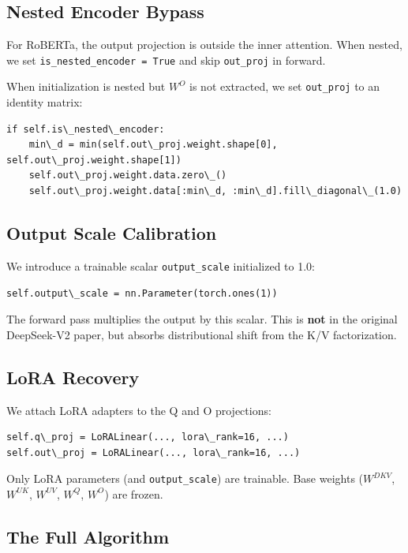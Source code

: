 \subsection{Nested Encoder Bypass}

For RoBERTa, the output projection is outside the inner attention. When 
nested, we set \texttt{is\_nested\_encoder = True} and skip \texttt{out\_proj} in forward.

When initialization is nested but $W^O$ is not extracted, we set 
\texttt{out\_proj} to an identity matrix:

\begin{lstlisting}
if self.is\_nested\_encoder:
    min\_d = min(self.out\_proj.weight.shape[0], self.out\_proj.weight.shape[1])
    self.out\_proj.weight.data.zero\_()
    self.out\_proj.weight.data[:min\_d, :min\_d].fill\_diagonal\_(1.0)
\end{lstlisting}

\subsection{Output Scale Calibration}

We introduce a trainable scalar \texttt{output\_scale} initialized to 1.0:

\begin{lstlisting}
self.output\_scale = nn.Parameter(torch.ones(1))
\end{lstlisting}

The forward pass multiplies the output by this scalar. This is \textbf{not} in 
the original DeepSeek-V2 paper, but absorbs distributional shift from the 
K/V factorization.

\subsection{LoRA Recovery}

We attach LoRA adapters to the Q and O projections:

\begin{lstlisting}
self.q\_proj = LoRALinear(..., lora\_rank=16, ...)
self.out\_proj = LoRALinear(..., lora\_rank=16, ...)
\end{lstlisting}

Only LoRA parameters (and \texttt{output\_scale}) are trainable. Base weights 
($W^{DKV}$, $W^{UK}$, $W^{UV}$, $W^Q$, $W^O$) are frozen.

\subsection{The Full Algorithm}

